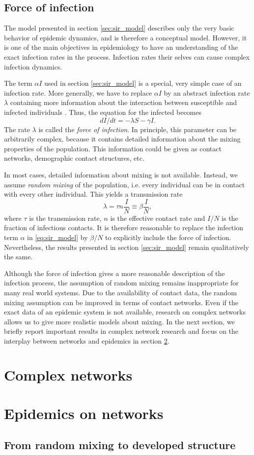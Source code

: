 \documentclass[openright,twoside,headsepline]{scrbook}
\begin{document}
\subsection{Force of infection}
The model presented in section \ref{sec:sir_model} describes only the very basic behavior of epidemic dynamics, and is therefore a conceptual model.
However, it is one of the main objectives in epidemiology to have an understanding of the exact infection rates in the process.
Infection rates their selves can cause complex infection dynamics.

The term $\alpha I$ used in section \ref{sec:sir_model} is a special, very simple case of an infection rate.
More generally, we have to replace $\alpha I$ by an abstract infection rate $\lambda $ containing more information about the interaction between susceptible and infected individuals \cite{Keeling:2005}.
Thus, the equation for the infected becomes
$$
dI/dt = -\lambda S -\gamma I.
$$
The rate $\lambda $ is called the \emph{force of infection}.
In principle, this parameter can be arbitrarily complex, because it contains detailed information about the mixing properties of the population.
This information could be given as contact networks, demographic contact structures, etc.

In most cases, detailed information about mixing is not available.
Instead, we assume \emph{random mixing} of the population, i.e. every individual can be in contact with every other individual.
This yields a transmission rate \cite{Keeling:2005}
\begin{equation}\label{eq:force_of_infection}
\lambda = \tau n \frac{I}{N}\equiv \beta \frac{I}{N},
\end{equation}
where $\tau $ is the transmission rate, $n$ is the effective contact rate and $I/N$ is the fraction of infectious contacts.
It is therefore reasonable to replace the infection term $\alpha $ in \eqref{eq:sir_model} by $\beta /N$ to explicitly include the force of infection.
Nevertheless, the results presented in section \ref{sec:sir_model} remain qualitatively the same.

Although the force of infection gives a more reasonable description of the infection process, the assumption of random mixing remains inappropriate for many real world systems.
Due to the availability of contact data, the random mixing assumption can be improved in terms of contact networks.
Even if the exact data of an epidemic system is not available, research on complex networks allows us to give more realistic models about mixing.
In the next section, we briefly report important results in complex network research and focus on the interplay between networks and epidemics in section \ref{sec:epidemics_on_networks}.


\section{Complex networks}


\section{Epidemics on networks}\label{sec:epidemics_on_networks}
\subsection{From random mixing to developed structure}
\end{document}
